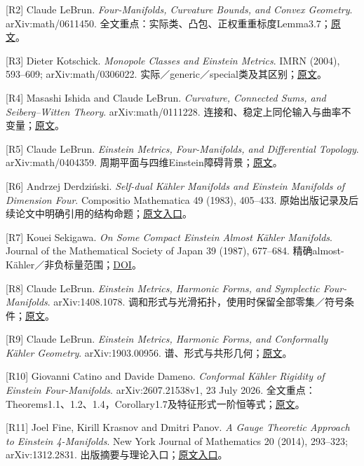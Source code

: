 \documentclass[
  11pt,
  a4paper,
  fontset=none]{ctexart}
\begin{document}
{[}R2{]} Claude LeBrun. \emph{Four-Manifolds, Curvature Bounds, and
Convex Geometry}. arXiv:math/0611450.
全文重点：实际类、凸包、正权重重标度Lemma3.7；\href{https://arxiv.org/abs/math/0611450}{原文}。

{[}R3{]} Dieter Kotschick. \emph{Monopole Classes and Einstein Metrics}.
IMRN (2004), 593--609; arXiv:math/0306022.
实际／generic／special类及其区别；\href{https://arxiv.org/abs/math/0306022}{原文}。

{[}R4{]} Masashi Ishida and Claude LeBrun. \emph{Curvature, Connected
Sums, and Seiberg--Witten Theory}. arXiv:math/0111228.
连接和、稳定上同伦输入与曲率不变量；\href{https://arxiv.org/abs/math/0111228}{原文}。

{[}R5{]} Claude LeBrun. \emph{Einstein Metrics, Four-Manifolds, and
Differential Topology}. arXiv:math/0404359.
周期平面与四维Einstein障碍背景；\href{https://arxiv.org/abs/math/0404359}{原文}。

{[}R6{]} Andrzej Derdziński. \emph{Self-dual Kähler Manifolds and
Einstein Manifolds of Dimension Four}. Compositio Mathematica 49 (1983),
405--433.
原始出版记录及后续论文中明确引用的结构命题；\href{https://www.numdam.org/item/CM_1983__49_3_405_0/}{原文入口}。

{[}R7{]} Kouei Sekigawa. \emph{On Some Compact Einstein Almost Kähler
Manifolds}. Journal of the Mathematical Society of Japan 39 (1987),
677--684.
精确almost-Kähler／非负标量范围；\href{https://doi.org/10.2969/jmsj/03940677}{DOI}。

{[}R8{]} Claude LeBrun. \emph{Einstein Metrics, Harmonic Forms, and
Symplectic Four-Manifolds}. arXiv:1408.1078.
调和形式与光滑拓扑，使用时保留全部零集／符号条件；\href{https://arxiv.org/abs/1408.1078}{原文}。

{[}R9{]} Claude LeBrun. \emph{Einstein Metrics, Harmonic Forms, and
Conformally Kähler Geometry}. arXiv:1903.00956.
谱、形式与共形几何；\href{https://arxiv.org/abs/1903.00956}{原文}。

{[}R10{]} Giovanni Catino and Davide Dameno. \emph{Conformal Kähler
Rigidity of Einstein Four-Manifolds}. arXiv:2607.21538v1, 23 July 2026.
全文重点：Theorems1.1、1.2、1.4，Corollary1.7及特征形式一阶恒等式；\href{https://arxiv.org/html/2607.21538v1}{原文}。

{[}R11{]} Joel Fine, Kirill Krasnov and Dmitri Panov. \emph{A Gauge
Theoretic Approach to Einstein 4-Manifolds}. New York Journal of
Mathematics 20 (2014), 293--323; arXiv:1312.2831.
出版摘要与理论入口；\href{https://nyjm.albany.edu/j/2014/20-18.html}{原文入口}。
\end{document}

